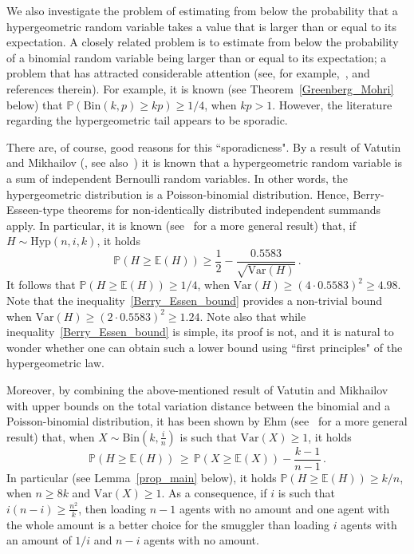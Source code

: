\documentclass[10pt]{article}
\theoremstyle{plain}
\theoremstyle{definition}
\theoremstyle{remark}
\newcommand{\Prb}{\mathbb{P}}
\newcommand{\Exp}{\mathbb{E}}
\begin{document}
We also investigate the problem of estimating from below the probability that a hypergeometric random variable takes a value that is larger than or equal to its expectation. 
A closely related problem is to estimate from below the probability of a binomial random variable being larger than or equal to its expectation; a problem that has attracted considerable attention (see, for example,~\cite{Doerr, greenberg2014tight, Pelekis_Ramon, Pinelis}, and references therein).  For example, it is known (see Theorem~\ref{Greenberg_Mohri} below) that $\Prb(\text{Bin}(k,p)\ge kp)\ge 1/4$, when $kp>1$. 
However, the literature regarding the hypergeometric tail appears to be sporadic.  

There are, of course,  good reasons for this ``sporadicness".  By a result of Vatutin and Mikhailov (\cite{Vatutin_Mikhailov}, see also~\cite{Hui_Park}) it is known that a hypergeometric random variable is a sum of independent Bernoulli random variables. In other words, the hypergeometric distribution is a Poisson-binomial distribution. 
Hence, Berry-Esseen-type theorems for non-identically distributed independent summands apply. In particular, it is known (see~\cite[Formula~(17)]{Mattner_Schulz} for a more general result)  that, if
$H\sim\text{Hyp}(n,i,k)$,  it holds
\begin{equation}\label{Berry_Essen_bound}
\Prb(H\ge \Exp(H)) \ge \frac{1}{2} - \frac{0.5583}{\sqrt{\text{Var}(H)}} \, .
\end{equation}
It follows that $\Prb(H\ge \Exp(H))\ge 1/4$, when $\text{Var}(H)\ge (4\cdot0.5583)^2 \ge 4.98$. 
Note that the inequality~\eqref{Berry_Essen_bound} provides a non-trivial bound when $\text{Var}(H) \ge (2\cdot0.5583)^2 \ge 1.24$. 
Note also that while inequality~\eqref{Berry_Essen_bound} is simple, its proof is not, and it is natural to wonder whether one can obtain such a lower bound using ``first principles" of the hypergeometric law. 


Moreover, by combining the above-mentioned result of  Vatutin and Mikhailov  with upper bounds on the total variation distance between the binomial and a Poisson-binomial distribution, 
it has been shown by Ehm (see~\cite[Theorem~2]{Ehm} for a more general result)  that,  when  $X\sim\text{Bin}(k,\frac{i}{n})$ is such that  $\text{Var}(X)\ge 1$,  it holds 
\begin{equation}\label{Ehm_bound}
\Prb(H\ge \Exp(H)) \,\ge\, \Prb(X\ge \Exp(X)) - \frac{k-1}{n-1} \, .
\end{equation} 
In particular (see Lemma~\ref{prop_main} below), it holds  $\Prb(H\ge \Exp(H))\ge k/n$, when 
$n\ge 8k$ and $\text{Var}(X)\ge 1$. As a consequence, if $i$ is such that $i(n-i)\ge \frac{n^2}{k}$, then loading $n-1$ agents with no amount and one agent with the whole amount is a better choice for the smuggler than loading $i$ agents with an amount of $1/i$ and $n-i$ agents with no amount.    
 
\end{document}
